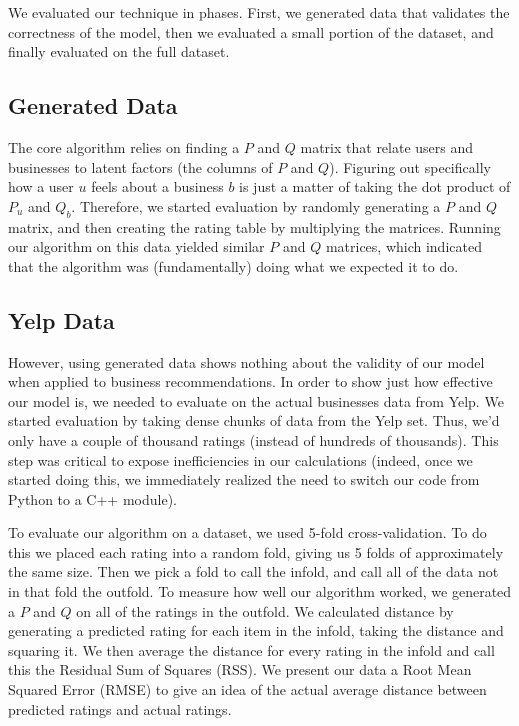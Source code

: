 We evaluated our technique in phases. First, we generated data that
validates the correctness of the model, then we evaluated a small portion of
the dataset, and finally evaluated on the full dataset.

\subsection{Generated Data}
The core algorithm relies on finding a $P$ and $Q$ matrix that relate users and
businesses to latent factors (the columns of $P$ and $Q$).  Figuring out
specifically how a user $u$ feels about a business $b$ is just a matter of
taking the dot product of $P_u$ and $Q_b$.  Therefore, we started evaluation by
randomly generating a $P$ and $Q$ matrix, and then creating the rating table
by multiplying the matrices. Running our algorithm on this data yielded similar
$P$ and $Q$ matrices, which indicated that the algorithm was (fundamentally) doing
what we expected it to do.

\subsection{Yelp Data}
However, using generated data shows nothing about the validity of our model
when applied to business recommendations. In order to show just how effective
our model is, we needed to evaluate on the actual businesses data from Yelp. We
started evaluation by taking dense chunks of data from the Yelp set. Thus, we'd
only have a couple of thousand ratings (instead of hundreds of thousands). 
This step was critical to expose inefficiencies in our calculations (indeed,
once we started doing this, we immediately realized the need to switch our code
from Python to a C++ module).

To evaluate our algorithm on a dataset, we used 5-fold cross-validation. To do
this we placed each rating into a random fold, giving us 5 folds of
approximately the same size. Then we pick a fold to call the infold, and call
all of the data not in that fold the outfold. To measure how well our algorithm
worked, we generated a $P$ and $Q$ on all of the ratings in the outfold. We
calculated distance by generating a predicted rating for each item in the
infold, taking the distance and squaring it. We then average the distance for
every rating in the infold and call this the Residual Sum of Squares (RSS). We
present our data a Root Mean Squared Error (RMSE) to give an idea of the actual
average distance between predicted ratings and actual ratings.

